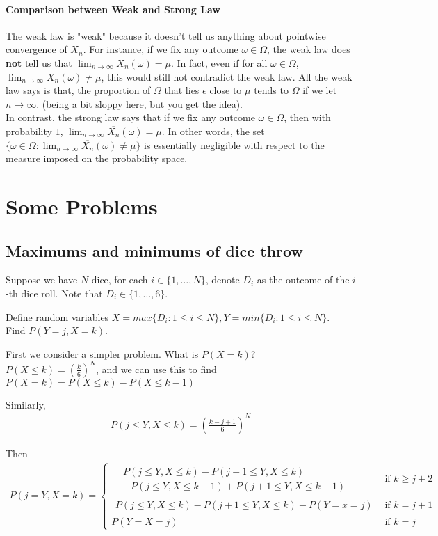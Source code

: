 \documentclass{article}
\begin{document}
\paragraph{Comparison between Weak and Strong Law}
The weak law is "weak" because it doesn't tell us anything about pointwise convergence of $\overline{X_n}$. For instance, if we fix any outcome $\omega \in \Omega$, the weak law does \textbf{not} tell us that $\lim_{n\rightarrow \infty}\overline{X_n}(\omega)=\mu$. In fact, even if for all $\omega \in \Omega$, $\lim_{n\rightarrow \infty}\overline{X_n}(\omega)\neq \mu$, this would still not contradict the weak law. All the weak law says is that, the proportion of $\Omega$ that lies $\epsilon$ close to $\mu$ tends to $\Omega$ if we let $n\rightarrow \infty$. (being a bit sloppy here, but you get the idea).
\\
In contrast, the strong law says that if we fix any outcome $\omega \in \Omega$, then with probability $1$, $\lim_{n\rightarrow \infty}\overline{X_n}(\omega)=\mu$. In other words, the set $\{\omega \in \Omega: \lim_{n\rightarrow \infty}\overline{X_n}(\omega) \neq \mu \}$ is essentially negligible with respect to the measure imposed on the probability space.



\section{Some Problems}
\subsection{Maximums and minimums of dice throw}
Suppose we have $N$ dice, for each $i\in \{1,\dots,N\}$, denote $D_i$ as the outcome of the $i$-th dice roll. Note that $D_i\in \{1,\dots, 6\}$.

Define random variables $X=max\{D_i:1\leq i\leq N\}, Y=min\{D_i:1\leq i\leq N\}$.\\
Find $P(Y=j, X=k)$.

First we consider a simpler problem. What is $P(X=k)$?\\
$P(X\leq k)=(\frac{k}{6})^N$, and we can use this to find $P(X=k)=P(X\leq k) - P(X\leq k-1)$

Similarly, 
\begin{align*}
	P(j\leq Y, X\leq k)=(\frac{k-j+1}{6})^N
\end{align*}

Then 
\begin{align*}
	P(j=Y, X=k) = 
	\begin{cases}
	\begin{aligned}
	&P(j\leq Y, X\leq k) - P(j+1\leq Y, X\leq k) \\
	&- P(j\leq Y, X\leq k-1) + P(j+1\leq Y, X\leq k-1)
	\end{aligned} &\text{if } k\geq j+2\\
	\begin{aligned}
	P(j\leq Y, X\leq k) - P(j+1\leq Y, X\leq k) - P(Y=x=j)
	\end{aligned} &\text{if } k=j+1\\
	P(Y=X=j) &\text{if } k=j
	\end{cases}
\end{align*}
\end{document}
